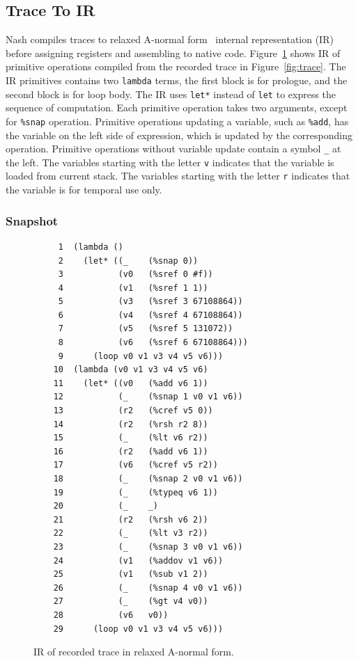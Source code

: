 \documentclass[preprint, 10pt]{sigplanconf}
\begin{document}
\subsection{Trace To IR}
Nash compiles traces to relaxed A-normal form~\cite{flanagan1993essence}
internal representation (IR) before assigning registers and assembling to
native code. Figure~\hyperref[fig:anf]{\ref{fig:anf}} shows IR of primitive
operations compiled from the recorded trace in
Figure~\hyperref[fig:trace]{\ref{fig:trace}}. The IR primitives contains two
\texttt{lambda} terms, the first block is for prologue, and the second block
is for loop body. The IR uses \texttt{let*} instead of \texttt{let} to express
the sequence of computation. Each primitive operation takes two arguments,
except for \texttt{\%snap} operation. Primitive operations updating a
variable, such as \texttt{\%add}, has the variable on the left side of
expression, which is updated by the corresponding operation. Primitive
operations without variable update contain a symbol \texttt{\_} at the
left. The variables starting with the letter \texttt{v} indicates that the
variable is loaded from current stack. The variables starting with the letter
\texttt{r} indicates that the variable is for temporal use only.

\subsubsection{Snapshot}

\begin{figure}
  \centering
  \small
\begin{verbatim}
     1	(lambda ()
     2    (let* ((_    (%snap 0))
     3           (v0   (%sref 0 #f))
     4           (v1   (%sref 1 1))
     5           (v3   (%sref 3 67108864))
     6           (v4   (%sref 4 67108864))
     7           (v5   (%sref 5 131072))
     8           (v6   (%sref 6 67108864)))
     9      (loop v0 v1 v3 v4 v5 v6)))
    10	(lambda (v0 v1 v3 v4 v5 v6)
    11    (let* ((v0   (%add v6 1))
    12           (_    (%snap 1 v0 v1 v6))
    13           (r2   (%cref v5 0))
    14           (r2   (%rsh r2 8))
    15           (_    (%lt v6 r2))
    16           (r2   (%add v6 1))
    17           (v6   (%cref v5 r2))
    18           (_    (%snap 2 v0 v1 v6))
    19           (_    (%typeq v6 1))
    20           (_    _)
    21           (r2   (%rsh v6 2))
    22           (_    (%lt v3 r2))
    23           (_    (%snap 3 v0 v1 v6))
    24           (v1   (%addov v1 v6))
    25           (v1   (%sub v1 2))
    26           (_    (%snap 4 v0 v1 v6))
    27           (_    (%gt v4 v0))
    28           (v6   v0))
    29      (loop v0 v1 v3 v4 v5 v6)))
\end{verbatim}
\caption{IR of recorded trace in relaxed A-normal form.}
\label{fig:anf}
\end{figure}
\end{document}
